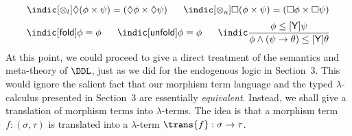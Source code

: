 \[ \indic [\otimes_{l}]\Diamond (\phi \times \psi ) = (\Diamond \phi \times \Diamond \psi ) \;\;\;\;\;\;
\indic [\otimes_{u}]\Box (\phi \times \psi ) = (\Box \phi \times \Box \psi ) \]
\[ \indic [{\sf fold}]\phi = \phi \;\;\;\;\;\; 
\indic [{\sf unfold}]\phi = \phi \;\;\;\;\;\; 
\indic \frac{\phi \leq [{\sf Y}]\psi}{\phi \wedge (\psi \rightarrow \theta ) \leq [{\sf Y}]\theta} \]
At this point, we could proceed to give a direct treatment of the semantics and meta-theory of $\DDL$, just as we did for the endogenous logic in Section~3.
This would ignore the salient fact that  our morphism term language and the
typed $\lambda$-calculus presented in Section~3 are essentially 
{\em equivalent}.
Instead, we shall give a translation of morphism terms into $\lambda$-terms.
The idea is that a morphism term $f : (\sigma , \tau )$ is translated into
a $\lambda$-term $\trans{f} : \sigma \rightarrow \tau$.
